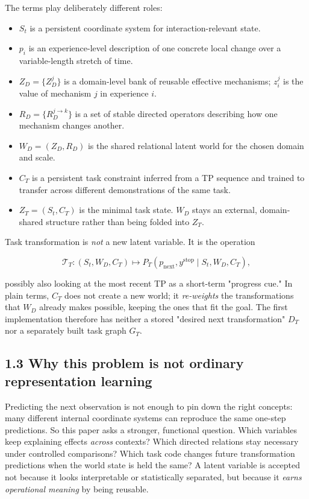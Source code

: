 \documentclass[11pt]{article}
\begin{document}
The terms play deliberately different roles:

\begin{itemize}
\item $S_t$ is a persistent coordinate system for interaction-relevant state.
\item $p_i$ is an experience-level description of one concrete local change over a variable-length stretch of time.
\item $Z_D=\{Z_D^j\}$ is a domain-level bank of reusable effective mechanisms; $z_i^j$ is the value of mechanism $j$ in experience $i$.
\item $R_D=\{R_D^{j\rightarrow k}\}$ is a set of stable directed operators describing how one mechanism changes another.
\item $W_D=(Z_D,R_D)$ is the shared relational latent world for the chosen domain and scale.
\item $C_T$ is a persistent task constraint inferred from a TP sequence and trained to transfer across different demonstrations of the same task.
\item $Z_T=(S_t,C_T)$ is the minimal task state. $W_D$ stays an external, domain-shared structure rather than being folded into $Z_T$.
\end{itemize}

Task transformation is \emph{not} a new latent variable. It is the operation

\[
\boxed{
\mathcal T_T:(S_t,W_D,C_T)\longmapsto
P_T(p_{\mathrm{next}},y^{\mathrm{stop}}\mid S_t,W_D,C_T),}
\]

possibly also looking at the most recent TP as a short-term "progress cue." In plain terms, $C_T$ does not create a new world; it
\emph{re-weights} the transformations that $W_D$ already makes possible, keeping the ones that fit the goal. The first
implementation therefore has neither a stored "desired next transformation" $D_T$ nor a separately built task graph $G_T$.

\subsection*{1.3 Why this problem is not ordinary representation learning}

Predicting the next observation is not enough to pin down the right concepts: many different internal coordinate systems can
reproduce the same one-step predictions. So this paper asks a stronger, functional question. Which variables keep explaining
effects \emph{across} contexts? Which directed relations stay necessary under controlled comparisons? Which task code changes
future transformation predictions when the world state is held the same? A latent variable is accepted not because it looks
interpretable or statistically separated, but because it \emph{earns operational meaning} by being reusable.
\end{document}
